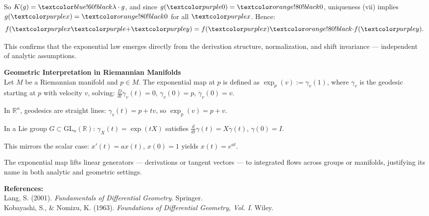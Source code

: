 \begin{technical}
So \( K(g) = \F{\lambda} \cdot g \), and since \( g(\A{0}) = \B{0} \), uniqueness (vii) implies \( g(\A{x}) = \B{0} \) for all \( \A{x} \). Hence:
\[
f(\A{x} \A{+} \A{y}) = f(\A{x}) \B{\cdot} f(\A{y}).
\]

This confirms that the exponential law emerges directly from the derivation structure, normalization, and shift invariance — independent of analytic assumptions.

\vspace{0.5em}

\noindent\textbf{Geometric Interpretation in Riemannian Manifolds}\\[0.3em]

Let \( M \) be a Riemannian manifold and \( p \in M \). The exponential map at \( p \) is defined as \( \exp_p(v) := \gamma_v(1) \), where \( \gamma_v \) is the geodesic starting at \( p \) with velocity \( v \), solving:
\( \frac{D}{dt} \dot{\gamma}_v(t) = 0 \), \( \gamma_v(0) = p \), \( \dot{\gamma}_v(0) = v \).

In \( \mathbb{R}^n \), geodesics are straight lines: \( \gamma_v(t) = p + tv \), so \( \exp_p(v) = p + v \).

In a Lie group \( G \subset \mathrm{GL}_n(\mathbb{R}) \): \( \gamma_X(t) = \exp(tX) \) satisfies \( \frac{d}{dt}\gamma(t) = X\gamma(t) \), \( \gamma(0) = I \).

This mirrors the scalar case: \( x'(t) = ax(t) \), \( x(0) = 1 \) yields \( x(t) = e^{at} \).

The exponential map lifts linear generators — derivations or tangent vectors — to integrated flows across groups or manifolds, justifying its name in both analytic and geometric settings.

\vspace{0.3em}
\noindent\textbf{References:}\\
Lang, S. (2001). \textit{Fundamentals of Differential Geometry}. Springer.\\
Kobayashi, S., \& Nomizu, K. (1963). \textit{Foundations of Differential Geometry, Vol. I}. Wiley.
\end{technical}
